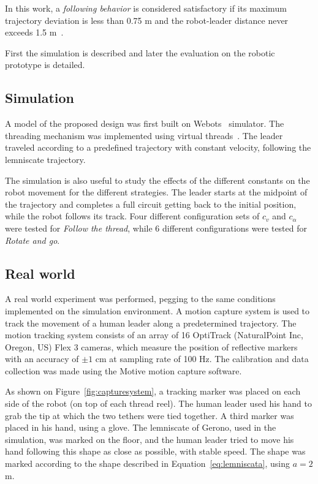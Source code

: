 \documentclass[journal]{IEEEtran}
\begin{document}
In this work, a \textit{following behavior} is considered satisfactory if its maximum trajectory deviation is less than 0.75 m and the robot-leader distance never exceeds 1.5 m~\cite{MunozCeballos2010}.

First the simulation is described and later the evaluation on the robotic prototype is detailed.

\subsection{Simulation}

A model of the proposed design was first built on Webots~\cite{Michel2004} simulator.  The threading mechanism was implemented using virtual threads~\cite{Rekleitis2001}.  The leader traveled according to a predefined trajectory with constant velocity, following the lemniscate trajectory.

The simulation is also useful to study the effects of the different constants on the robot movement  for the different strategies.  The leader starts at the midpoint of the trajectory and completes a full circuit getting back to the initial position, while the robot follows its track.  Four different configuration sets of $c_v$ and  $c_{\alpha}$ were tested for \textit{Follow the thread}, while 6 different configurations were tested for \textit{Rotate and go}.

\subsection{Real world}



A real world experiment was performed, pegging to the same conditions implemented on the simulation environment.  A motion capture system is used to track the movement of a human leader along a predetermined trajectory.   The motion tracking system consists of an array of 16 OptiTrack (NaturalPoint Inc, Oregon, US) Flex 3 cameras, which measure the position of reflective markers with an accuracy of $\pm1$ cm at sampling rate of 100 Hz. The calibration and data collection was made using the Motive motion capture software. 

As shown on Figure~\ref{fig:capturesystem}, a tracking marker was placed on each side of the robot (on top of each thread reel). The human leader used his hand to grab the tip at which the two tethers were tied together. A third marker was placed in his hand, using a glove. The lemniscate of Gerono, used in the simulation, was marked on the floor, and the human leader tried to move his hand following this shape as close as possible, with stable speed.  The shape was marked according to the shape described in Equation~\ref{eq:lemniscata}, using $a = 2$ m.
\end{document}
